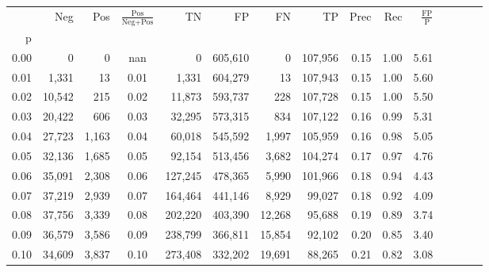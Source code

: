 \begin{tabular}{rrrcrrrrrrrrrrr}
\toprule
{} &     Neg &    Pos & $\frac{\text{Pos}}{\text{Neg}+\text{Pos}}$ &       TN &       FP &       FN &       TP &  Prec &   Rec & $\frac{\text{FP}}{\text{P}}$ \\
p    &         &        &                                            &          &          &          &          &       &       &                              \\
\midrule
0.00 &       0 &      0 &                                        nan &        0 &  605,610 &        0 &  107,956 &  0.15 &  1.00 &                         5.61 \\
0.01 &   1,331 &     13 &                                       0.01 &    1,331 &  604,279 &       13 &  107,943 &  0.15 &  1.00 &                         5.60 \\
0.02 &  10,542 &    215 &                                       0.02 &   11,873 &  593,737 &      228 &  107,728 &  0.15 &  1.00 &                         5.50 \\
0.03 &  20,422 &    606 &                                       0.03 &   32,295 &  573,315 &      834 &  107,122 &  0.16 &  0.99 &                         5.31 \\
0.04 &  27,723 &  1,163 &                                       0.04 &   60,018 &  545,592 &    1,997 &  105,959 &  0.16 &  0.98 &                         5.05 \\
0.05 &  32,136 &  1,685 &                                       0.05 &   92,154 &  513,456 &    3,682 &  104,274 &  0.17 &  0.97 &                         4.76 \\
0.06 &  35,091 &  2,308 &                                       0.06 &  127,245 &  478,365 &    5,990 &  101,966 &  0.18 &  0.94 &                         4.43 \\
0.07 &  37,219 &  2,939 &                                       0.07 &  164,464 &  441,146 &    8,929 &   99,027 &  0.18 &  0.92 &                         4.09 \\
0.08 &  37,756 &  3,339 &                                       0.08 &  202,220 &  403,390 &   12,268 &   95,688 &  0.19 &  0.89 &                         3.74 \\
0.09 &  36,579 &  3,586 &                                       0.09 &  238,799 &  366,811 &   15,854 &   92,102 &  0.20 &  0.85 &                         3.40 \\
0.10 &  34,609 &  3,837 &                                       0.10 &  273,408 &  332,202 &   19,691 &   88,265 &  0.21 &  0.82 &                         3.08 \\

\end{tabular}
